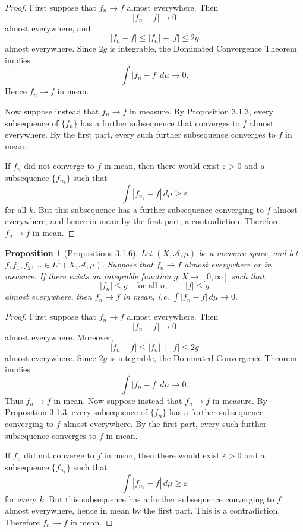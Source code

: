\documentclass[12pt]{article}
\newtheorem{proposition}{Proposition}
\begin{document}
\begin{proof}
First suppose that $f_n\to f$ almost everywhere. Then
\[
|f_n-f|\to 0
\]
almost everywhere, and
\[
|f_n-f|\le |f_n|+|f|\le 2g
\]
almost everywhere. Since $2g$ is integrable, the Dominated Convergence Theorem
implies
\[
\int |f_n-f|\,d\mu \to 0.
\]
Hence $f_n\to f$ in mean.

Now suppose instead that $f_n\to f$ in measure. By Proposition 3.1.3, every
subsequence of $\{f_n\}$ has a further subsequence that converges to $f$ almost
everywhere. By the first part, every such further subsequence converges to $f$
in mean.

If $f_n$ did not converge to $f$ in mean, then there would exist
$\varepsilon>0$ and a subsequence $\{f_{n_k}\}$ such that
\[
\int |f_{n_k}-f|\,d\mu \ge \varepsilon
\]
for all $k$. But this subsequence has a further subsequence converging to $f$
almost everywhere, and hence in mean by the first part, a contradiction.
Therefore $f_n\to f$ in mean.
\end{proof}

\begin{proposition}[Propositions 3.1.6]
Let $(X,\mathcal{A},\mu)$ be a measure space, and let
$f,f_1,f_2,\dots \in L^1(X,\mathcal{A},\mu)$. Suppose that $f_n\to f$ almost
everywhere or in measure. If there exists an integrable function
$g:X\to[0,\infty]$ such that
\[
|f_n|\le g
\quad \text{for all } n,
\qquad
|f|\le g
\]
almost everywhere, then $f_n\to f$ in mean, i.e. $\int |f_n-f|\,d\mu \to 0.$
\end{proposition}

\begin{proof}
First suppose that $f_n\to f$ almost everywhere. Then
\[
|f_n-f|\to 0
\]
almost everywhere. Moreover,
\[
|f_n-f|\le |f_n|+|f|\le 2g
\]
almost everywhere. Since $2g$ is integrable, the Dominated Convergence Theorem
implies
\[
\int |f_n-f|\,d\mu \to 0.
\]
Thus $f_n\to f$ in mean. Now suppose instead that $f_n\to f$ in measure. By Proposition 3.1.3, every
subsequence of $\{f_n\}$ has a further subsequence converging to $f$ almost
everywhere. By the first part, every such further subsequence converges to $f$
in mean.

If $f_n$ did not converge to $f$ in mean, then there would exist
$\varepsilon>0$ and a subsequence $\{f_{n_k}\}$ such that
\[
\int |f_{n_k}-f|\,d\mu \ge \varepsilon
\]
for every $k$. But this subsequence has a further subsequence converging to $f$
almost everywhere, hence in mean by the first part. This is a contradiction.
Therefore $f_n\to f$ in mean.
\end{proof}
\end{document}
